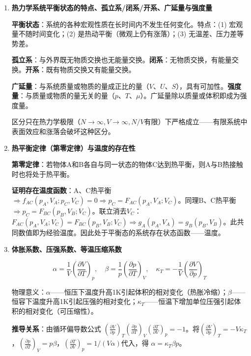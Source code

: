 \documentclass[12pt,a4paper,fontset=mac]{ctexart}
\newcommand{\đ}{\mathrm{đ}}
\begin{document}
\begin{enumerate}

\item \textbf{热力学系统平衡状态的特点、孤立系/闭系/开系、广延量与强度量}

\textbf{平衡状态}：系统的各种宏观性质在长时间内不发生任何变化。特点：(1) 宏观量不随时间变化；(2) 是热动平衡（微观上仍有涨落）；(3) 无温差、压力差等势差。

\textbf{孤立系}：与外界既无物质交换也无能量交换。\textbf{闭系}：无物质交换，有能量交换。\textbf{开系}：既有物质交换又有能量交换。

\textbf{广延量}：与系统质量或物质的量成正比的量（$V$、$U$、$S$），具有可加性。\textbf{强度量}：与质量或物质的量无关的量（$p$、$T$、$\mu$）。广延量除以质量或体积即成为强度量。

区分只在热力学极限（$N\to\infty, V\to\infty, N/V$有限）下严格成立——有限系统中表面效应和涨落会破坏这种区分。

\item \textbf{热平衡定律（第零定律）与温度的存在性}

\textbf{第零定律}：若物体A和B各自与同一状态的物体C达到热平衡，则A与B热接触时也将处于热平衡。

\textbf{证明存在温度函数}：A、C热平衡 $\Rightarrow f_{AC}(p_A,V_A;p_C,V_C)=0 \Rightarrow p_C=F_{AC}(p_A,V_A;V_C)$。同理B、C热平衡 $\Rightarrow p_C=F_{BC}(p_B,V_B;V_C)$。联立消去$V_C$：$F_{AC}(p_A,V_A;V_C)=F_{BC}(p_B,V_B;V_C) \Rightarrow g_A(p_A,V_A)=g_B(p_B,V_B)$。此共同数值即为经验温度。因此处于平衡态的系统存在状态函数——温度。

\item \textbf{体胀系数、压强系数、等温压缩系数}

\[\alpha=\frac{1}{V}\!\left(\frac{\partial V}{\partial T}\right)_p,\quad \beta=\frac{1}{p}\!\left(\frac{\partial p}{\partial T}\right)_V,\quad \kappa_T=-\frac{1}{V}\!\left(\frac{\partial V}{\partial p}\right)_T\]

物理意义：$\alpha$——恒压下温度升高1K引起体积的相对变化（热胀冷缩）；$\beta$——恒容下温度升高1K引起压强的相对变化；$\kappa_T$——恒温下增加单位压强引起体积的相对变化（可压缩性）。

\textbf{推导关系}：由循环偏导数公式 $\left(\frac{\partial V}{\partial p}\right)_T\left(\frac{\partial p}{\partial T}\right)_V\left(\frac{\partial T}{\partial V}\right)_p=-1$。将$\left(\frac{\partial V}{\partial p}\right)_T=-V\kappa_T$，$\left(\frac{\partial p}{\partial T}\right)_V=p\beta$，$\left(\frac{\partial T}{\partial V}\right)_p=1/(V\alpha)$代入，得 $\alpha=\kappa_T\beta p$。


\end{enumerate}
\end{document}
